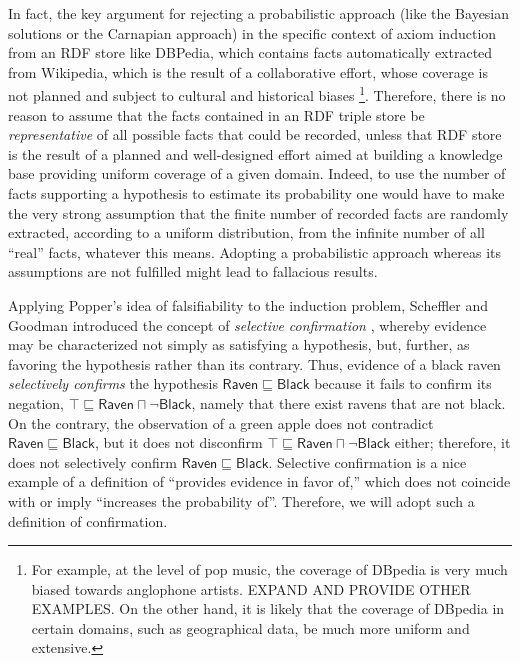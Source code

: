 \documentclass[a4paper]{article}
\newcounter{ex}
\begin{document}
In fact, the key argument for rejecting a probabilistic approach (like the Bayesian solutions
or the Carnapian approach) in the specific context of axiom induction from an RDF store
like DBPedia, which contains facts automatically extracted from Wikipedia,
which is the result of a collaborative effort, whose coverage is not planned and
subject to cultural and historical biases \footnote{For example, at the level
of pop music, the coverage of DBpedia is very much biased towards anglophone artists.
EXPAND AND PROVIDE OTHER EXAMPLES. On the other hand, it is likely that the coverage
of DBpedia in certain domains, such as geographical data, be much more uniform and
extensive.}.
Therefore, there is no reason to assume that the facts contained in an RDF triple store
be \emph{representative} of all possible facts that could be recorded, unless
that RDF store is the result of a planned and well-designed effort aimed at building
a knowledge base providing uniform coverage of a given domain.
Indeed, to use the number of facts supporting a hypothesis
to estimate its probability one would have to make the very strong assumption
that the finite number of recorded facts are randomly extracted, according to a
uniform distribution, from the infinite number of all ``real'' facts, whatever
this means. Adopting a probabilistic approach whereas its assumptions are not
fulfilled might lead to fallacious results.

Applying Popper's idea of falsifiability to the induction problem,
Scheffler and Goodman introduced the concept of \emph{selective confirmation}
\cite{SchefflerGoodman1972}, whereby evidence may be characterized
not simply as satisfying a hypothesis, but, further, as favoring the hypothesis
rather than its contrary.
Thus, evidence of a black raven \emph{selectively confirms} the hypothesis
$\mathsf{Raven} \sqsubseteq \mathsf{Black}$ because it fails to confirm its
negation, $\top \sqsubseteq \mathsf{Raven} \sqcap \neg\mathsf{Black}$, namely
that there exist ravens that are not black. On the contrary, the observation of
a green apple does not contradict $\mathsf{Raven} \sqsubseteq \mathsf{Black}$,
but it does not disconfirm $\top \sqsubseteq \mathsf{Raven} \sqcap \neg\mathsf{Black}$
either; therefore, it does not selectively confirm $\mathsf{Raven} \sqsubseteq \mathsf{Black}$.
Selective confirmation is a nice example of a definition of ``provides evidence in favor of,''
which does not coincide with or imply ``increases the probability of''.
Therefore, we will adopt such a definition of confirmation.
\end{document}
